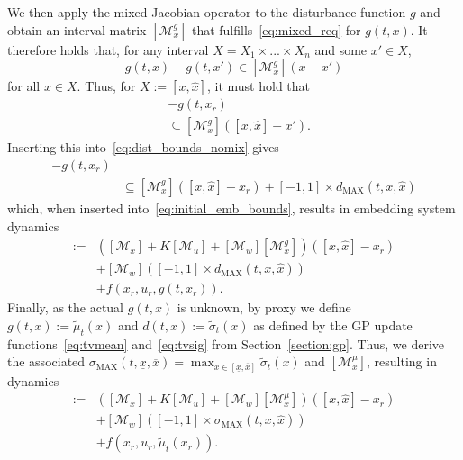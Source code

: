 \documentclass[preprint,12pt]{elsarticle}
\newcommand{\ul}{\underline}
\newcommand{\ol}{\overline}
\begin{document}
We then apply the mixed Jacobian operator to the disturbance function $g$ and obtain an interval matrix $[\mathcal{M}^g_x]$ that fulfills~\eqref{eq:mixed_req} for $g(t, x)$. It therefore holds that, for any interval $X=X_1 \times ...\times X_n$ and some $x' \in X$, 
\begin{equation}
    g(t, x) - g(t, x') \in [\mathcal{M}^g_x](x - x')
\end{equation}
for all $x \in X$. Thus, for $X:=[x, \widehat{x}]$, it must hold that
\begin{align}
    [\min_{x \in [x, \widehat{x}]}{g(t, x)}, \max_{x \in [x, \widehat{x}]}{g(t, x)}] &- g(t, x_r) \\
    &\subseteq [\mathcal{M}^g_x]([x, \widehat{x}] - x'). \nonumber
\end{align}
Inserting this into~\eqref{eq:dist_bounds_nomix} gives
\begin{align}
    [\ul{\gamma}&(t, x, \widehat{x}), \ol{\gamma}(t, x, \widehat{x})] - g(t, x_r) \label{eq:dist_bounds_mix}
    \\
    &\subseteq [\mathcal{M}^g_x]([x, \widehat{x}] - x_r) + [-1,1] \times d_{\text{MAX}}(t, x, \widehat{x})\nonumber
\end{align}
which, when inserted into~\eqref{eq:initial_emb_bounds}, results in embedding system dynamics
\begin{align}
    [\dot{x}, \dot{\widehat{x}}] := &([\mathcal{M}_x] + K[\mathcal{M}_u] + [\mathcal{M}_w][\mathcal{M}^g_x])([x, \widehat{x}] - x_r) \nonumber \\
    &+ [\mathcal{M}_w]([-1,1] \times d_{\text{MAX}}(t, x, \widehat{x})) \nonumber\\
    &+ f(x_r, u_r, g(t, x_r)).
\end{align}
Finally, as the actual $g(t, x)$ is unknown, by proxy we define $g(t, x) := \widetilde{\mu}_t(x)$ and $d(t, x):= \widetilde{\sigma}_t(x)$  as defined by the \ac{GP} update functions~\eqref{eq:tvmean} and~\eqref{eq:tvsig} from Section~\ref{section:gp}. Thus, we derive the associated $\sigma_{\text{MAX}}(t, \ul{x}, \ol{x}) = \max_{x \in [\ul{x}, \ol{x}]}{\widetilde{\sigma}_t(x)}$ and $[\mathcal{M}^\mu_x]$, resulting in dynamics
\begin{align}
    [\dot{x}, \dot{\widehat{x}}] := &([\mathcal{M}_x] + K[\mathcal{M}_u] + [\mathcal{M}_w][\mathcal{M}^\mu_x])([x, \widehat{x}] - x_r) \nonumber \\
    &+ [\mathcal{M}_w]([-1,1] \times \sigma_{\text{MAX}}(t, x, \widehat{x})) \nonumber \\
    &+ f(x_r, u_r, \widetilde{\mu}_t(x_r)). \label{eq:final_emb}
\end{align}
\end{document}

